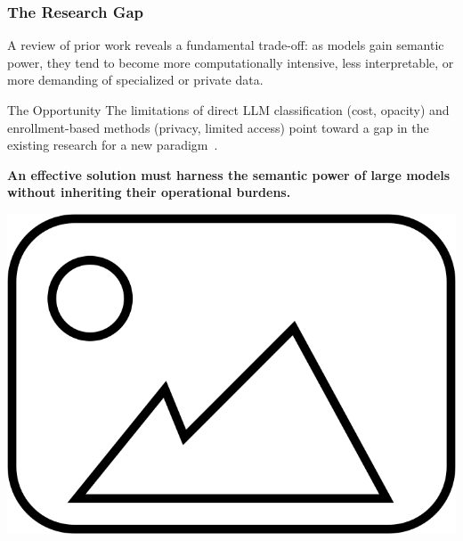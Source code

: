 \documentclass[aspectratio=169,10pt]{beamer}
\begin{document}
\begin{frame}
    \frametitle{The Research Gap}
    
    A review of prior work reveals a fundamental trade-off: as models gain semantic power, they tend to become more computationally intensive, less interpretable, or more demanding of specialized or private data.
    
    \begin{alertblock}{The Opportunity}
        The limitations of direct LLM classification (cost, opacity) and enrollment-based methods (privacy, limited access) point toward a gap in the existing research for a new paradigm~\cite{pardos-articulation-2019, slade10.1177/0002764213479366}.
        \vspace{1em}
        
        \textbf{An effective solution must harness the semantic power of large models without inheriting their operational burdens.}
    \end{alertblock}

    \vspace{0.5em}
    
    
    \centering
    \includegraphics[scale=0.15]{placeholder.png} %

\end{frame}
\end{document}
